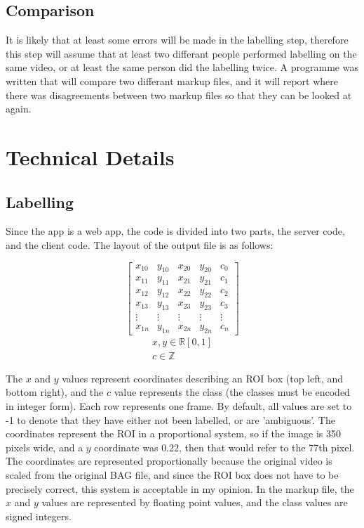     \subsection{Comparison} 
    It is likely that at least some errors will be made in the labelling step, therefore this step will assume that at least two differant people performed labelling on the same video, or at least the same person did the labelling twice. A programme was written that will compare two differant markup files, and it will report where there was disagreements between two markup files so that they can be looked at again.

\section{Technical Details}
    \subsection{Labelling}
    Since the app is a web app, the code is divided into two parts, the server code, and the client code. The layout of the output file is as follows:

    \[
    \begin{bmatrix}
    x_{10} & y_{10} & x_{20} & y_{20} & c_{0} \\
    x_{11} & y_{11} & x_{21} & y_{21} & c_{1} \\
    x_{12} & y_{12} & x_{22} & y_{22} & c_{2} \\
    x_{13} & y_{13} & x_{23} & y_{23} & c_{3} \\
    \vdots & \vdots & \vdots & \vdots & \vdots\\
    x_{1n} & y_{1n} & x_{2n} & y_{2n} & c_{n} 
    \end{bmatrix}
    \]
    \begin{gather*}
    x, y \in \mathbb{R} [0, 1]\\
    c \in \mathbb{Z}
    \end{gather*}

    The $x$ and $y$ values represent coordinates describing an ROI box (top left, and bottom right), and the $c$ value represents the class (the classes must be encoded in integer form). Each row represents one frame. By default, all values are set to -1 to denote that they have either not been labelled, or are 'ambiguous'. The coordinates represent the ROI in a proportional system, so if the image is 350 pixels wide, and a $y$ coordinate was $0.22$, then that would refer to the 77th pixel. The coordinates are represented proportionally because the original video is scaled from the original BAG file, and since the ROI box does not have to be precisely correct, this system is acceptable in my opinion. In the markup file, the $x$ and $y$ values are represented by floating point values, and the class values are signed integers.

